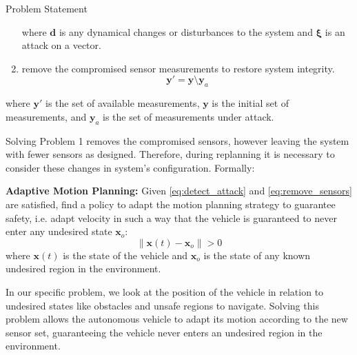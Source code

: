 \begin{section}{Problem Statement}
\begin{problem}
\begin{enumerate}
\begin{equation}
	\end{equation}
where $\bm{d}$ is any dynamical changes or disturbances to the system and $\bm{\xi}$ is an attack on a vector.
	\item remove the compromised sensor measurements to restore system integrity.
	 \vspace{-5pt}
	\begin{equation}
	\label{eq:remove_sensors}
	    \bm{y}'=\bm{y} \setminus \bm{y}_a
	\end{equation}
\end{enumerate}
where $\bm{y}'$ is the set of available measurements, $\bm{y}$ is the initial set of measurements, and $\bm{y}_a$ is the set of measurements under attack.


\end{problem}
Solving Problem 1 removes the compromised sensors, however leaving the system with fewer sensors as designed. Therefore, during replanning it is necessary to consider these changes in system's configuration. Formally:
	
\begin{problem} \label{problem2} {\textbf{Adaptive Motion Planning:}}
Given \eqref{eq:detect_attack} and \eqref{eq:remove_sensors} are satisfied, find a policy to adapt the motion planning strategy to guarantee safety, i.e. adapt velocity in such a way that the vehicle is guaranteed to never enter any undesired state $\bm{x}_o$:  
	\begin{equation}
		\lVert {\bm{x}(t)-\bm{x}_o} \rVert > 0
	\end{equation}
where $\bm{x}(t)$ is the state of the vehicle and $\bm{x}_o$ is the state of any known undesired region in the environment.
	\end{problem}

In our specific problem, we look at the position of the vehicle in relation to undesired states like obstacles and unsafe regions to navigate. Solving this problem allows the autonomous vehicle to adapt its motion according to the new sensor set, guaranteeing the vehicle never enters an undesired region in the environment.
\end{section}